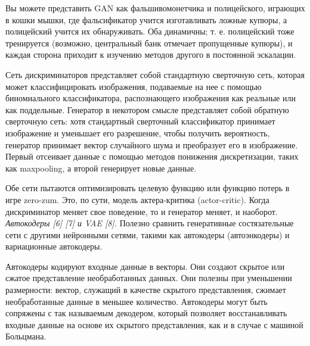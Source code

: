 \documentclass{article}
\begin{document}
Вы можете представить GAN как фальшивомонетчика и полицейского, играющих в кошки мышки, где фальсификатор учится изготавливать ложные купюры, а полицейский учится их обнаруживать. Оба динамичны; т. е. полицейский тоже тренируется (возможно, центральный банк отмечает пропущенные купюры), и каждая сторона приходит к изучению методов другого в постоянной эскалации.

Сеть дискриминаторов представляет собой стандартную сверточную сеть, которая может классифицировать изображения, подаваемые на нее с помощью биномиального классификатора, распознающего изображения как реальные или как поддельные. Генератор в некотором смысле представляет собой обратную сверточную сеть: хотя стандартный сверточный классификатор принимает изображение и уменьшает его разрешение, чтобы получить вероятность, генератор принимает вектор случайного шума и преобразует его в изображение. Первый отсеивает данные с помощью методов понижения дискретизации, таких как maxpooling, а второй генерирует новые данные.

Обе сети пытаются оптимизировать целевую функцию или функцию потерь в игре zero-zum. Это, по сути, модель актера-критика (actor-critic). Когда дискриминатор меняет свое поведение, то и генератор меняет, и наоборот. \\

\textit{Автокодеры [6] [7] и VAE [8]. }Полезно сравнить генеративные состязательные сети с другими нейронными сетями, такими как автокодеры (автоэнкодеры) и вариационные автокодеры.

Автокодеры кодируют входные данные в векторы. Они создают скрытое или сжатое представление необработанных данных. Они полезны при уменьшении размерности: вектор, служащий в качестве скрытого представления, сжимает необработанные данные в меньшее количество. Автокодеры могут быть сопряжены с так называемым декодером, который позволяет восстанавливать входные данные на основе их скрытого представления, как и в случае с машиной Больцмана.
\end{document}
